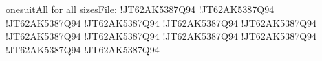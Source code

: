 \documentclass[onedown-examples]{subfiles}
\begin{document}
\begin{HBox}{onesuitAll for all sizes\hfill File: \FileName}
\gamefont{\sffamily\bfseries\tiny}
\onesuitAll!{JT62}{AK53}{87}{Q94}
\gamefont{\sffamily\bfseries\HUGE}
\onesuitAll!{JT62}{AK53}{87}{Q94}
%
\gamefont{\sffamily\bfseries\ssmall}
\onesuitAll!{JT62}{AK53}{87}{Q94}
\gamefont{\sffamily\bfseries\Huge}
\onesuitAll!{JT62}{AK53}{87}{Q94}
%
\gamefont{\sffamily\bfseries\scriptsize}
\onesuitAll!{JT62}{AK53}{87}{Q94}
\gamefont{\sffamily\bfseries\huge}
\onesuitAll!{JT62}{AK53}{87}{Q94}
%
\gamefont{\sffamily\bfseries\footnotesize}
\onesuitAll!{JT62}{AK53}{87}{Q94}
\gamefont{\sffamily\bfseries\LARGE}
\onesuitAll!{JT62}{AK53}{87}{Q94}
%
\gamefont{\sffamily\bfseries\small}
\onesuitAll!{JT62}{AK53}{87}{Q94}
\gamefont{\sffamily\bfseries\Large}
\onesuitAll!{JT62}{AK53}{87}{Q94}
%
\gamefont{\sffamily\bfseries\normalsize}
\onesuitAll!{JT62}{AK53}{87}{Q94}
\gamefont{\sffamily\bfseries\large}
\onesuitAll!{JT62}{AK53}{87}{Q94}
\end{HBox}
\vfill
\end{document}
